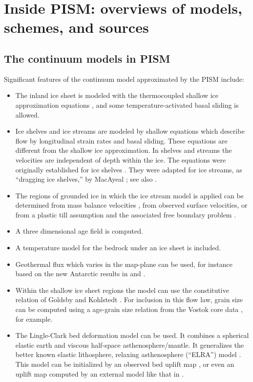 \documentclass[11pt,final]{amsart}
\begin{document}
\clearpage\newpage
\section{Inside PISM: overviews of models, schemes, and sources}\label{sect:over}

\subsection{The continuum models in PISM}  Significant features of the continuum model approximated by the PISM include:\begin{itemize}
\item The inland ice sheet is modeled with the thermocoupled shallow ice approximation equations \cite{Fowler}, and some temperature-activated basal sliding is allowed.
\item Ice shelves and ice streams are modeled by shallow equations which describe flow by longitudinal strain rates and basal sliding.  These equations are different from the shallow ice approximation.  In shelves and streams the velocities are independent of depth within the ice.  The equations were originally established for ice shelves \cite{Morland,MorlandZainuddin,MacAyealetal}.  They were adapted for ice streams, as ``dragging ice shelves,'' by MacAyeal \cite{MacAyeal}; see also \cite{HulbeMacAyeal}.
\item The regions of grounded ice in which the ice stream model is applied can be determined from mass balance velocities \cite{BamberVaughanJoughin}, from observed surface velocities, or from a plastic till assumption and the associated free boundary problem \cite{SchoofStream}.
\item A three dimensional age field is computed.
\item A temperature model for the bedrock under an ice sheet is included.
\item Geothermal flux which varies in the map-plane can be used, for instance based on the new Antarctic results in \cite{ShapiroRitzwoller} and \cite{FoxMaule}.
\item Within the shallow ice sheet regions the model can use the constitutive relation of Goldsby and Kohlstedt \cite{GoldsbyKohlstedt,Peltieretal}.  For inclusion in this flow law, grain size can be computed using a age-grain size relation from the Vostok core data \cite{VostokCore}, for example.
\item The Lingle-Clark \cite{BLKfastearth,LingleClark} bed deformation model can be used.  It combines a spherical elastic earth and viscous half-space asthenosphere/mantle.  It generalizes the better known elastic lithosphere, relaxing asthenosphere (``ELRA'') model \cite{Greve2001}.  This model can be initialized by an observed bed uplift map \cite{BLKfastearth}, or even an uplift map computed by an external model like that in \cite{IvinsJames2005}.\end{itemize}
\end{document}
